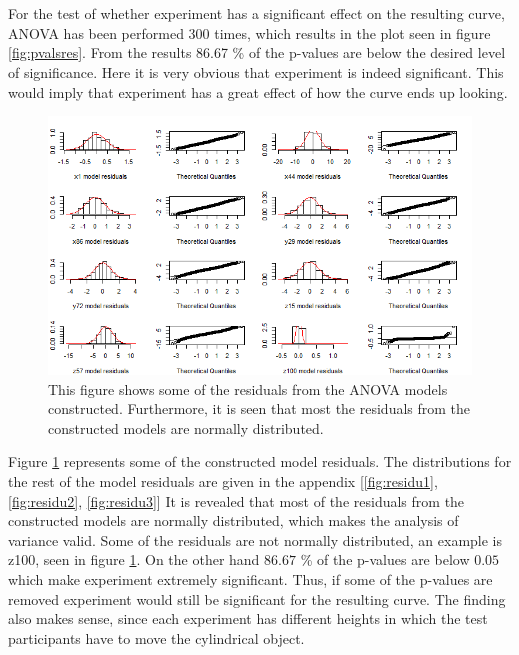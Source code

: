 \documentclass[11pt, fleqn, titlepage]{article}
\begin{document}
\\\\
For the test of whether experiment has a significant effect on the resulting curve, ANOVA has been performed 300 times, which results in the plot seen in figure \ref{fig:pvalsres}. From the results 86.67 \% of the p-values are below the desired level of significance. Here it is very obvious that experiment is indeed significant. This would imply that experiment has a great effect of how the curve ends up looking.
\begin{figure}[H]
	\centering
	\includegraphics[width=0.7\linewidth]{billeder/StadigNormalfordeltAF.png}
	\caption{This figure shows some of the residuals from the ANOVA models constructed. Furthermore, it is seen that most the residuals from the constructed models are normally distributed. }
	\label{fig:stadignormalfordeltaf}
\end{figure} \noindent \vspace*{-0.1cm}
 Figure \ref{fig:stadignormalfordeltaf} represents some of the constructed model residuals. The distributions for the rest of the model residuals are given in the appendix [\ref{fig:residu1}, \ref{fig:residu2}, \ref{fig:residu3}] It is revealed that most of the residuals from the constructed models are normally distributed, which makes the analysis of variance valid. Some of the residuals are not normally distributed, an example is z100, seen in figure \ref{fig:stadignormalfordeltaf}. On the other hand $ 86.67 $ \% of the p-values are below $ 0.05 $ which make experiment extremely significant. Thus, if some of the p-values are removed  experiment would still be significant for the resulting curve. The finding also makes sense, since each experiment has different heights in which the test participants have to move the cylindrical object. 
\end{document}
